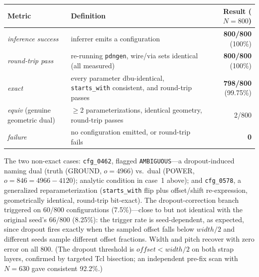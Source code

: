 \documentclass[11pt]{article}
\begin{document}
\begin{center}
\small
\begin{tabular}{l>{\raggedright\arraybackslash}p{5.2cm}r}
\toprule
Metric & Definition & Result ($N=800$) \\
\midrule
\textit{inference success} & inferrer emits a configuration &
\textbf{800/800} (100\%) \\
\textit{round-trip pass} & re-running \texttt{pdngen}, wire/via sets
identical (all measured) & \textbf{800/800} (100\%) \\
\textit{exact} & every parameter dbu-identical,
\texttt{starts\_with} consistent, and round-trip passes &
\textbf{798/800} (99.75\%) \\
\textit{equiv} (genuine geometric dual) & $\geq$2 parameterizations,
identical geometry, round-trip passes & 2/800 \\
\textit{failure} & no configuration emitted, or round-trip fails &
\textbf{0} \\
\bottomrule
\end{tabular}
\end{center}

The two non-exact cases: \texttt{cfg\_0462}, flagged
\texttt{AMBIGUOUS}---a dropout-induced naming dual (truth (GROUND,
$o{=}4966$) vs.\ dual (POWER, $o{=}846{=}4966-4120$); analytic condition
in case~1 above); and \texttt{cfg\_0578}, a generalized
reparameterization (\texttt{starts\_with} flip plus offset/shift
re-expression, geometrically identical, round-trip bit-exact).  The
dropout-correction branch triggered on 60/800 configurations
(7.5\%)---close to but not identical with the original seed's 66/800
(8.25\%): the trigger rate is seed-dependent, as expected, since dropout
fires exactly when the sampled offset falls below $\mathit{width}/2$
and different seeds sample different offset fractions.  Width and pitch
recover with zero error on all 800.  (The dropout threshold is
$\mathit{offset} < \mathit{width}/2$ on both strap layers, confirmed by
targeted Tcl bisection; an independent pre-fix scan with $N=630$ gave
consistent 92.2\%.)
\end{document}
